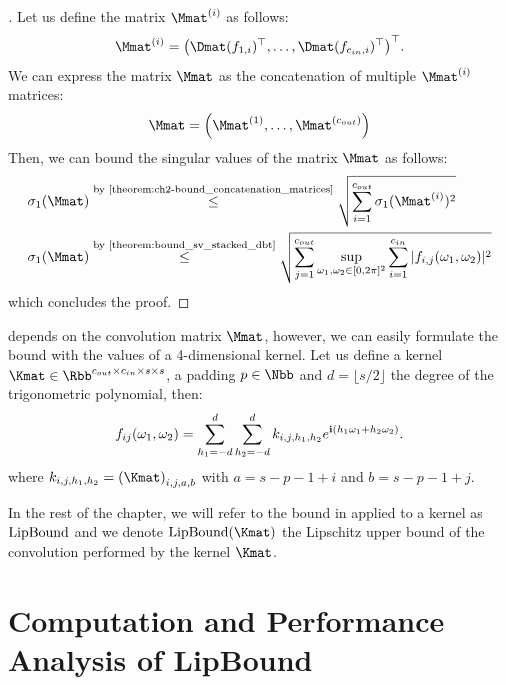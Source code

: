 \begin{proof}[]
  Let us define the matrix $\Mmat^{(i)}$ as follows:
\begin{equation}
  \Mmat^{(i)} = \leftmat \Dmat(f_{1, i})^\top, \dots, \Dmat(f_{\cin, i})^\top \rightmat^\top .
\end{equation}
We can express the matrix $\Mmat$ as the concatenation of multiple $\Mmat^{(i)}$ matrices:
\begin{equation}
  \Mmat = \leftmat \Mmat^{(1)}, \dots, \Mmat^{(\cout)} \rightmat
\end{equation}
Then, we can bound the singular values of the matrix $\Mmat$ as follows:
\begin{align}
  \sigma_1\left(\Mmat\right) &\stackrel{\text{by \Cref{theorem:ch2-bound_concatenation_matrices}}}{\leq} \sqrt{\sum_{i=1}^{\cout} \sigma_1(\Mmat^{(i)})^2} \\
  \sigma_1\left(\Mmat\right) &\stackrel{\text{by \Cref{theorem:bound_sv_stacked_dbt}}}{\leq} \sqrt{\sum_{j=1}^{\cout} \sup_{\omega_1, \omega_2 \in [0, 2\pi]^2} \sum_{i=1}^{\cin} |f_{i,j}(\omega_1, \omega_2)|^2 }
\end{align}
which concludes the proof. 
\end{proof}

\endgroup
\pagebreak

 depends on the convolution matrix $\Mmat$, however, we can easily formulate the bound with the values of a 4-dimensional kernel.
Let us define a kernel $\Kmat \in \Rbb^{\cout \times \cin \times s \times s}$, a padding $p \in \Nbb$ and $d = \lfloor s / 2 \rfloor$ the degree of the trigonometric polynomial, then:
\begin{equation}
  f_{ij}(\omega_1, \omega_2) = \sum_{h_1 = -d}^d \sum_{h_2 = -d}^d k_{i, j, h_1,h_2} e^{\mathbf{i} (h_1 \omega_1 + h_2 \omega_2)}.
\end{equation}
where $k_{i, j, h_1,h_2} = \leftmat \Kmat \rightmat_{i, j, a, b}$ with $a =  s - p - 1 + i$ and $b =  s - p - 1 + j$.

In the rest of the chapter, we will refer to the bound in  applied to a kernel as $\mathrm{LipBound}$ and we denote $\lipbound(\Kmat)$ the Lipschitz upper bound of the convolution performed by the kernel $\Kmat$. 


\section{Computation and Performance Analysis of LipBound}
\label{section:ch5-computation_and_performance_analysis_of_lipbound}

